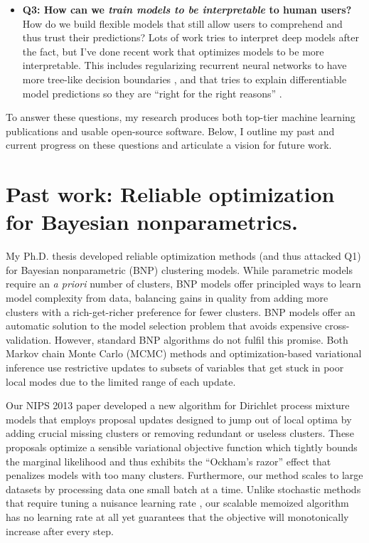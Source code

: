 \documentclass[11pt,letterpaper]{article}
\begin{document}
\begin{itemize}
\item \textbf{Q3: How can we \emph{train models to be interpretable} to human users?}
How do we build flexible models that still allow users to comprehend and thus trust their predictions?
Lots of work tries to interpret deep models after the fact, but
I've done recent work that optimizes models to be more interpretable.
This includes regularizing recurrent neural networks to have more tree-like decision boundaries \cite{todo}, and that tries to explain differentiable model predictions so they are ``right for the right reasons'' \cite{todo}.
\end{itemize}

To answer these questions, my research produces both top-tier machine learning publications and usable open-source software.
Below, I outline my past and current progress on these questions and articulate a vision for future work.



\section{Past work: Reliable optimization for Bayesian nonparametrics.}

My Ph.D. thesis developed reliable optimization methods (and thus attacked Q1) for Bayesian nonparametric (BNP) clustering models.
While parametric models require an \emph{a priori} number of clusters,
BNP models offer principled ways to 
learn model complexity from data,
balancing gains in quality from adding more clusters with a rich-get-richer preference for fewer clusters.
BNP models offer an automatic solution to the model selection problem that avoids expensive cross-validation. 
However, standard BNP algorithms do not fulfil this promise. Both Markov chain Monte Carlo (MCMC) methods and optimization-based variational inference use restrictive updates to subsets of variables that get stuck in poor local modes due to the limited range of each update.

Our NIPS 2013 paper \cite{hughes2013moVB} developed a new algorithm for Dirichlet process mixture models that employs proposal updates designed to jump out of local optima by adding crucial missing clusters or removing redundant or useless clusters. 
These proposals optimize a sensible variational objective function which tightly bounds the marginal likelihood and thus exhibits the ``Ockham's razor'' effect that penalizes models with too many clusters.
Furthermore, our method scales to large datasets by processing data one small batch at a time. Unlike stochastic methods that require tuning a nuisance learning rate \cite{hoffman:svi}, our scalable memoized algorithm has no learning rate at all yet guarantees that the objective will monotonically increase after every step.
\end{document}
